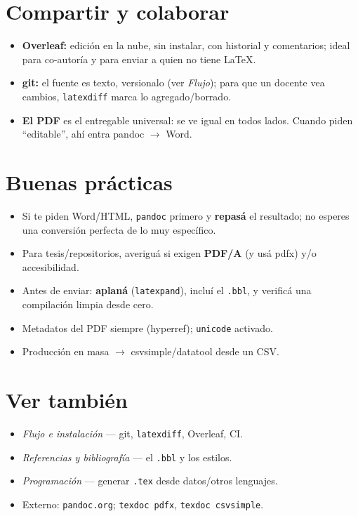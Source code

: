 \documentclass[11pt,a4paper]{article}
\newcommand{\pkg}[1]{\textsf{#1}}
\begin{document}
\section{Compartir y colaborar}
\begin{itemize}[noitemsep,leftmargin=*]
  \item \textbf{Overleaf:} edición en la nube, sin instalar, con historial y
        comentarios; ideal para co-autoría y para enviar a quien no tiene \LaTeX.
  \item \textbf{git:} el fuente es texto, versionalo (ver \emph{Flujo}); para que
        un docente vea cambios, \texttt{latexdiff} marca lo agregado/borrado.
  \item \textbf{El PDF} es el entregable universal: se ve igual en todos lados.
        Cuando piden \enquote{editable}, ahí entra pandoc $\to$ Word.
\end{itemize}

\section{Buenas prácticas}
\begin{itemize}[noitemsep,leftmargin=*]
  \item Si te piden Word/HTML, \texttt{pandoc} primero y \textbf{repasá} el
        resultado; no esperes una conversión perfecta de lo muy específico.
  \item Para tesis/repositorios, averiguá si exigen \textbf{PDF/A} (y usá
        \pkg{pdfx}) y/o accesibilidad.
  \item Antes de enviar: \textbf{aplaná} (\texttt{latexpand}), incluí el
        \texttt{.bbl}, y verificá una compilación limpia desde cero.
  \item Metadatos del PDF siempre (\pkg{hyperref}); \texttt{unicode} activado.
  \item Producción en masa $\to$ \pkg{csvsimple}/\pkg{datatool} desde un CSV.
\end{itemize}

\section*{Ver también}
\begin{itemize}[noitemsep,leftmargin=*]
  \item \emph{Flujo e instalación} — git, \texttt{latexdiff}, Overleaf, CI.
  \item \emph{Referencias y bibliografía} — el \texttt{.bbl} y los estilos.
  \item \emph{Programación} — generar \texttt{.tex} desde datos/otros lenguajes.
  \item Externo: \texttt{pandoc.org}; \texttt{texdoc pdfx}, \texttt{texdoc csvsimple}.
\end{itemize}
\end{document}
